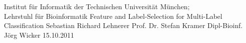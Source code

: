 \documentclass[a4paper]{article}
\begin{document}
               {Institut für Informatik der Technischen Universität München;\\Lehrstuhl für Bioinformatik}
               {Feature and Label-Selection for Multi-Label Classification}
               {Sebastian Richard Lehnerer}
               {Prof. Dr. Stefan Kramer}
               {Dipl-Bioinf. Jörg Wicker}
               {15.10.2011}
\end{document}
